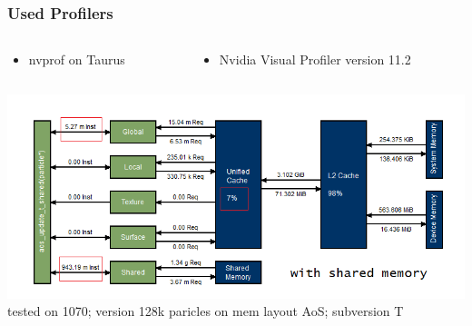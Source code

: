 \documentclass[aspectratio=169]{beamer}
\begin{document}
\begin{frame}
	\frametitle{Used Profilers}
	\begin{columns}
	\begin{column}{0.3\textwidth}
		\begin{itemize}
			\small \item nvprof on Taurus
		\end{itemize}
	\end{column}
	
	\begin{column}{0.5\textwidth}
		\begin{itemize}
			\small \item Nvidia Visual Profiler version 11.2
		\end{itemize}
	\end{column}
	\end{columns}
	\smallskip
	\includegraphics[scale=0.50]{resources/128-1070-aos-update-t-shared.png}
	\smallskip
	\small tested on 1070; version 128k paricles on mem layout AoS; subversion T
\end{frame}
\end{document}
